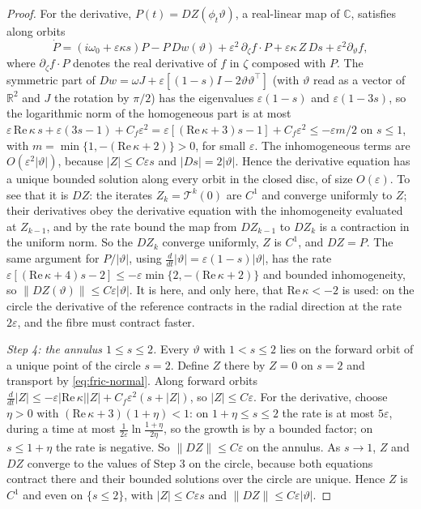 \documentclass[11pt,reqno]{amsart}
\theoremstyle{plain}
\theoremstyle{definition}
\theoremstyle{remark}
\newcommand{\R}{\mathbb{R}}
\newcommand{\C}{\mathbb{C}}
\begin{document}
\begin{proof}
For the derivative, $P(t)=DZ(\phi_t\vartheta)$, a real-linear map of $\C$, satisfies along orbits
\[
  \dot P=(i\omega_0+\varepsilon\kappa s)P-P\,Dw(\vartheta)+\varepsilon^{2}\,\partial_\zeta f\cdot P+\varepsilon\kappa\,Z\,Ds+\varepsilon^{2}\partial_\vartheta f ,
\]
where $\partial_\zeta f\cdot P$ denotes the real derivative of $f$ in $\zeta$ composed with $P$. The symmetric part of
$Dw=\omega J+\varepsilon[(1-s)I-2\vartheta\vartheta^{\top}]$ (with $\vartheta$ read as a vector of $\R^{2}$ and $J$ the rotation by $\pi/2$) has the
eigenvalues $\varepsilon(1-s)$ and $\varepsilon(1-3s)$, so the logarithmic norm of the homogeneous part is at most
$\varepsilon\,\mathrm{Re}\,\kappa\,s+\varepsilon(3s-1)+C_f\varepsilon^{2}=\varepsilon[(\mathrm{Re}\,\kappa+3)s-1]+C_f\varepsilon^{2}\le-\varepsilon m/2$ on
$s\le1$, with $m=\min\{1,-(\mathrm{Re}\,\kappa+2)\}>0$, for small $\varepsilon$. The inhomogeneous terms are
$O(\varepsilon^{2}|\vartheta|)$, because $|Z|\le C\varepsilon s$ and $|Ds|=2|\vartheta|$. Hence the derivative
equation has a unique bounded solution along every orbit in the closed disc, of size $O(\varepsilon)$. To see that it is
$DZ$: the iterates $Z_k=\mathcal T^{k}(0)$ are $C^{1}$ and converge uniformly to $Z$; their derivatives obey the derivative
equation with the inhomogeneity evaluated at $Z_{k-1}$, and by the rate bound the map from $DZ_{k-1}$ to $DZ_k$ is a
contraction in the uniform norm. So the $DZ_k$ converge uniformly, $Z$ is $C^{1}$, and $DZ=P$. The same argument for $P/|\vartheta|$, using
$\frac{d}{dt}|\vartheta|=\varepsilon(1-s)|\vartheta|$, has the rate $\varepsilon[(\mathrm{Re}\,\kappa+4)s-2]\le-\varepsilon\min\{2,-(\mathrm{Re}\,\kappa+2)\}$ and
bounded inhomogeneity, so $\|DZ(\vartheta)\|\le C\varepsilon|\vartheta|$. It is here, and only here, that $\mathrm{Re}\,\kappa<-2$ is used:
on the circle the derivative of the reference contracts in the radial direction at the rate $2\varepsilon$, and the fibre
must contract faster.

\emph{Step 4: the annulus $1\le s\le2$.} Every $\vartheta$ with $1<s\le2$ lies on the forward orbit of a unique point of the
circle $s=2$. Define $Z$ there by $Z=0$ on $s=2$ and transport by \eqref{eq:fric-normal}. Along forward orbits
$\frac{d}{dt}|Z|\le-\varepsilon|\mathrm{Re}\,\kappa||Z|+C_f\varepsilon^{2}(s+|Z|)$, so $|Z|\le C\varepsilon$. For the derivative, choose
$\eta>0$ with $(\mathrm{Re}\,\kappa+3)(1+\eta)<1$: on $1+\eta\le s\le2$ the rate is at most $5\varepsilon$, during a time at most
$\frac1{2\varepsilon}\ln\frac{1+\eta}{2\eta}$, so the growth is by a bounded factor; on $s\le1+\eta$ the rate is negative.
So $\|DZ\|\le C\varepsilon$ on the annulus. As $s\to1$, $Z$ and $DZ$ converge to the values of Step 3 on the circle,
because both equations contract there and their bounded solutions over the circle are unique. Hence $Z$ is
$C^{1}$ and even on $\{s\le2\}$, with $|Z|\le C\varepsilon s$ and $\|DZ\|\le C\varepsilon|\vartheta|$.


\end{proof}
\end{document}
